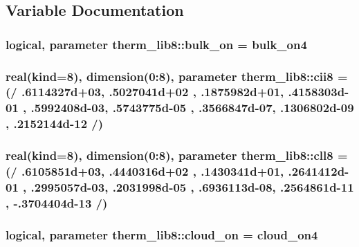 \subsection{Variable Documentation}
\hypertarget{namespacetherm__lib8_aa2d5118204fcd26e0603d47b2bd1a48c}{}
\subsubsection[{bulk\+\_\+on}]{\setlength{\rightskip}{0pt plus 5cm}logical, parameter therm\+\_\+lib8\+::bulk\+\_\+on = bulk\+\_\+on4}\label{namespacetherm__lib8_aa2d5118204fcd26e0603d47b2bd1a48c}
\hypertarget{namespacetherm__lib8_aa9cd8b30beb20347cc9a45f40fd72baa}{}
\subsubsection[{cii8}]{\setlength{\rightskip}{0pt plus 5cm}real(kind=8), dimension(0\+:8), parameter therm\+\_\+lib8\+::cii8 = (/ .\+6114327d+03, .\+5027041d+02 , .\+1875982d+01, .\+4158303d-\/01 , .\+5992408d-\/03, .\+5743775d-\/05 , .\+3566847d-\/07, .\+1306802d-\/09 , .\+2152144d-\/12 /)}\label{namespacetherm__lib8_aa9cd8b30beb20347cc9a45f40fd72baa}
\hypertarget{namespacetherm__lib8_a1f1e0a0dd53bbaf4515bc58ada29dba7}{}
\subsubsection[{cll8}]{\setlength{\rightskip}{0pt plus 5cm}real(kind=8), dimension(0\+:8), parameter therm\+\_\+lib8\+::cll8 = (/ .\+6105851d+03, .\+4440316d+02 , .\+1430341d+01, .\+2641412d-\/01 , .\+2995057d-\/03, .\+2031998d-\/05 , .\+6936113d-\/08, .\+2564861d-\/11 , -\/.\+3704404d-\/13 /)}\label{namespacetherm__lib8_a1f1e0a0dd53bbaf4515bc58ada29dba7}
\hypertarget{namespacetherm__lib8_a826524c63660fd35bee5d07fa43c19e0}{}
\subsubsection[{cloud\+\_\+on}]{\setlength{\rightskip}{0pt plus 5cm}logical, parameter therm\+\_\+lib8\+::cloud\+\_\+on = cloud\+\_\+on4}\label{namespacetherm__lib8_a826524c63660fd35bee5d07fa43c19e0}
\hypertarget{namespacetherm__lib8_a3bfe64ca1b1761eb7fddc3aa544df182}{}
